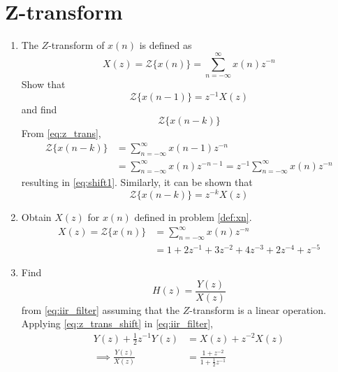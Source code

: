 \documentclass[journal,12pt,twocolumn]{IEEEtran}
\renewcommand\thesection{\arabic{section}}
\begin{document}
\section{Z-transform}
\begin{enumerate}[label=\thesection.\arabic*,ref=\thesection.\theenumi]
\item The $Z$-transform of $x(n)$ is defined as
%
\begin{equation}
\label{eq:z_trans}
X(z)={\mathcal {Z}}\{x(n)\}=\sum _{n=-\infty }^{\infty }x(n)z^{-n}
\end{equation}
%
Show that
\begin{equation}
\label{eq:shift1}
{\mathcal {Z}}\{x(n-1)\} = z^{-1}X(z)
\end{equation}
and find
\begin{equation}
	{\mathcal {Z}}\{x(n-k)\} 
\end{equation}
\solution From \eqref{eq:z_trans},
\begin{align}
{\mathcal {Z}}\{x(n-k)\} &=\sum _{n=-\infty }^{\infty }x(n-1)z^{-n}
\\
&=\sum _{n=-\infty }^{\infty }x(n)z^{-n-1} = z^{-1}\sum _{n=-\infty }^{\infty }x(n)z^{-n}
\end{align}
resulting in \eqref{eq:shift1}. Similarly, it can be shown that
%
\begin{equation}
\label{eq:z_trans_shift}
	{\mathcal {Z}}\{x(n-k)\} = z^{-k}X(z)
\end{equation}

\item Obtain $X(z)$ for $x(n)$ defined in problem \ref{def:xn}.\\
\solution
\begin{align}
	X(z)={\mathcal{Z}}\{x(n)\} &= \sum_{n=-\infty}
^{\infty}x(n)z^{-n}\\ &= 1+2z^{-1}+3z^{-2}+4z^{-3}+2z^{-4}+z^{-5}
\end{align}	
\item Find
%
\begin{equation}
H(z) = \frac{Y(z)}{X(z)}
\end{equation}
%
from  \eqref{eq:iir_filter} assuming that the $Z$-transform is a linear operation.
\\
\solution  Applying \eqref{eq:z_trans_shift} in \eqref{eq:iir_filter},
\begin{align}
Y(z) + \frac{1}{2}z^{-1}Y(z) &= X(z)+z^{-2}X(z)
\\
\implies \frac{Y(z)}{X(z)} &= \frac{1 + z^{-2}}{1 + \frac{1}{2}z^{-1}}
\label{eq:freq_resp}
\end{align}


\end{enumerate}
\end{document}
